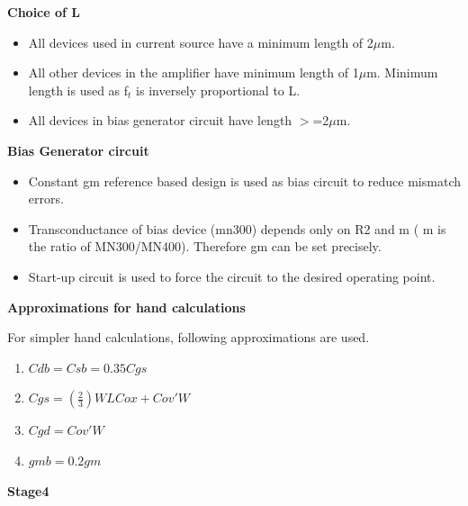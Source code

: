 \documentclass[12pt,a4paper]{article}
\begin{document}
\textbf{Choice of L}

\begin{itemize}
\item All devices used in current source have a minimum length of 2$\mu$m.
\item All other devices in the amplifier have minimum length of 1$\mu$m. 
Minimum length is used as f$_{t }$ is inversely proportional to L.
\item All devices in bias generator circuit have length $>$=2$\mu$m.
\end{itemize}


\textbf{Bias Generator circuit}

\begin{itemize}
\item Constant gm reference based design is used as bias circuit to 
reduce mismatch errors.
\item Transconductance of bias device (mn300) depends only on R2 and m ( 
m is the ratio of MN300/MN400). Therefore gm can be set precisely.
\item Start-up circuit is used to force the circuit to the desired 
operating point.
\end{itemize}


\textbf{Approximations for hand calculations}

For simpler hand calculations, following approximations are used.

\begin{enumerate}
\item $Cdb=Csb=0.35 Cgs$
\item $Cgs=(\frac{2}{3})WLCox+Cov'W$
\item $Cgd=Cov'W$
\item $gmb=0.2gm$
\setcounter{numberedCntBB}{\theenumi}
\end{enumerate}


\textbf{Stage4}
\end{document}
